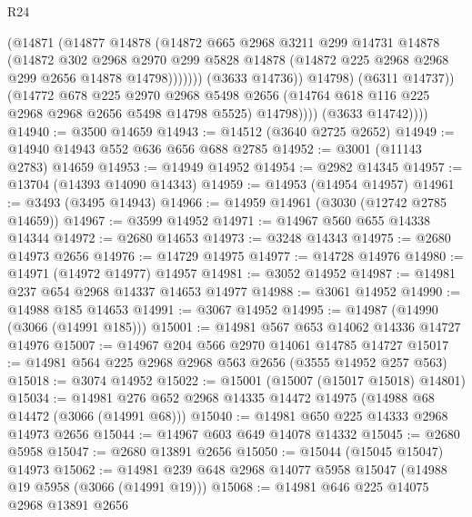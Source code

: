 \begin{lexlean}{R24}
\begin{coremodule}
                          (@14871
                            (@14877
                              @14878
                              (@14872
                                @665
                                @2968
                                @3211
                                @299
                                @14731
                                @14878
                                (@14872
                                  @302
                                  @2968
                                  @2970
                                  @299
                                  @5828
                                  @14878
                                  (@14872 @225 @2968 @2968 @299 @2656 @14878 @14798)))))))
                      (@3633 @14736))
                    @14798)
                  (@6311 @14737))
                (@14772
                  @678
                  @225
                  @2970
                  @2968
                  @5498
                  @2656
                  (@14764 @618 @116 @225 @2968 @2968 @2656 @5498 @14798 @5525)
                  @14798))))
          (@3633 @14742))))
@14940 := @3500 @14659
@14943 := @14512 (@3640 @2725 @2652)
@14949 := @14940 @14943 @552 @636 @656 @688 @2785
@14952 := @3001 (@11143 @2783) @14659
@14953 := @14949 @14952
@14954 := @2982 @14345
@14957 := @13704 (@14393 @14090 @14343)
@14959 := @14953 (@14954 @14957)
@14961 := @3493 (@3495 @14943)
@14966 := @14959 @14961 (@3030 (@12742 @2785 @14659))
@14967 := @3599 @14952
@14971 := @14967 @560 @655 @14338 @14344
@14972 := @2680 @14653
@14973 := @3248 @14343
@14975 := @2680 @14973 @2656
@14976 := @14729 @14975
@14977 := @14728 @14976
@14980 := @14971 (@14972 @14977) @14957
@14981 := @3052 @14952
@14987 := @14981 @237 @654 @2968 @14337 @14653 @14977
@14988 := @3061 @14952
@14990 := @14988 @185 @14653
@14991 := @3067 @14952
@14995 := @14987 (@14990 (@3066 (@14991 @185)))
@15001 := @14981 @567 @653 @14062 @14336 @14727 @14976
@15007 := @14967 @204 @566 @2970 @14061 @14785 @14727
@15017 := @14981 @564 @225 @2968 @2968 @563 @2656 (@3555 @14952 @257 @563)
@15018 := @3074 @14952
@15022 := @15001 (@15007 (@15017 @15018) @14801)
@15034 := @14981 @276 @652 @2968 @14335 @14472 @14975 (@14988 @68 @14472 (@3066 (@14991 @68)))
@15040 := @14981 @650 @225 @14333 @2968 @14973 @2656
@15044 := @14967 @603 @649 @14078 @14332
@15045 := @2680 @5958
@15047 := @2680 @13891 @2656
@15050 := @15044 (@15045 @15047) @14973
@15062 := @14981 @239 @648 @2968 @14077 @5958 @15047 (@14988 @19 @5958 (@3066 (@14991 @19)))
@15068 := @14981 @646 @225 @14075 @2968 @13891 @2656

\end{coremodule}
\end{lexlean}
